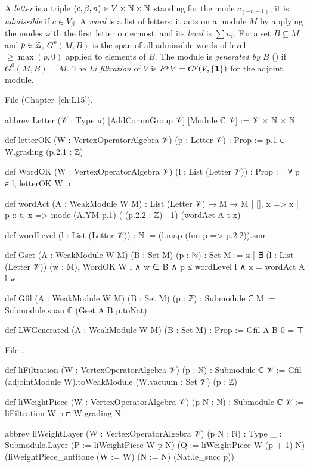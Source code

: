 \begin{definition}\label{l11:def:gfil}
A \emph{letter} is a triple $(c,\beta,n)\in V\times{\mathbb{N}}\times{\mathbb{N}}$ standing for the mode $c_{(-n-1)}$; it is
\emph{admissible} if $c\in V_\beta$. A \emph{word} is a list of letters; it acts on a module $M$ by
applying the modes with the first letter outermost, and its \emph{level} is $\sum n_i$. For a set
$B\subseteq M$ and $p\in{\mathbb{Z}}$, $G^p(M,B)$ is the span of all admissible words of level $\ge\max(p,0)$
applied to elements of $B$. The module is \emph{generated by $B$} () if $G^0(M,B) = M$.
The \emph{Li filtration} of $V$ is $F^pV = G^p(V,\{\mathbf{1}\})$ for the adjoint module.
\end{definition}
\noindent File  (Chapter~\ref{ch:L15}).
\begin{leancode}
abbrev Letter (𝒱 : Type u) [AddCommGroup 𝒱] [Module ℂ 𝒱] := 𝒱 × ℕ × ℕ

def letterOK (W : VertexOperatorAlgebra 𝒱) (p : Letter 𝒱) : Prop :=
  p.1 ∈ W.grading (p.2.1 : ℤ)

def WordOK (W : VertexOperatorAlgebra 𝒱) (l : List (Letter 𝒱)) : Prop := ∀ p ∈ l, letterOK W p

def wordAct (A : WeakModule W M) : List (Letter 𝒱) → M → M
  | [], x => x
  | p :: t, x => mode (A.YM p.1) (-(p.2.2 : ℤ) - 1) (wordAct A t x)

def wordLevel (l : List (Letter 𝒱)) : ℕ := (l.map (fun p => p.2.2)).sum

def Gset (A : WeakModule W M) (B : Set M) (p : ℕ) : Set M :=
  {x | ∃ (l : List (Letter 𝒱)) (w : M), WordOK W l ∧ w ∈ B ∧ p ≤ wordLevel l ∧
    x = wordAct A l w}

def Gfil (A : WeakModule W M) (B : Set M) (p : ℤ) : Submodule ℂ M :=
  Submodule.span ℂ (Gset A B p.toNat)

def LWGenerated (A : WeakModule W M) (B : Set M) : Prop := Gfil A B 0 = ⊤
\end{leancode}
\noindent File .
\begin{leancode}
def liFiltration (W : VertexOperatorAlgebra 𝒱) (p : ℕ) : Submodule ℂ 𝒱 :=
  Gfil (adjointModule W).toWeakModule ({W.vacuum} : Set 𝒱) (p : ℤ)

def liWeightPiece (W : VertexOperatorAlgebra 𝒱) (p N : ℕ) : Submodule ℂ 𝒱 :=
  liFiltration W p ⊓ W.grading N

abbrev liWeightLayer (W : VertexOperatorAlgebra 𝒱) (p N : ℕ) : Type _ :=
  Submodule.Layer (P := liWeightPiece W p N) (Q := liWeightPiece W (p + 1) N)
    (liWeightPiece_antitone (W := W) (N := N) (Nat.le_succ p))
\end{leancode}

